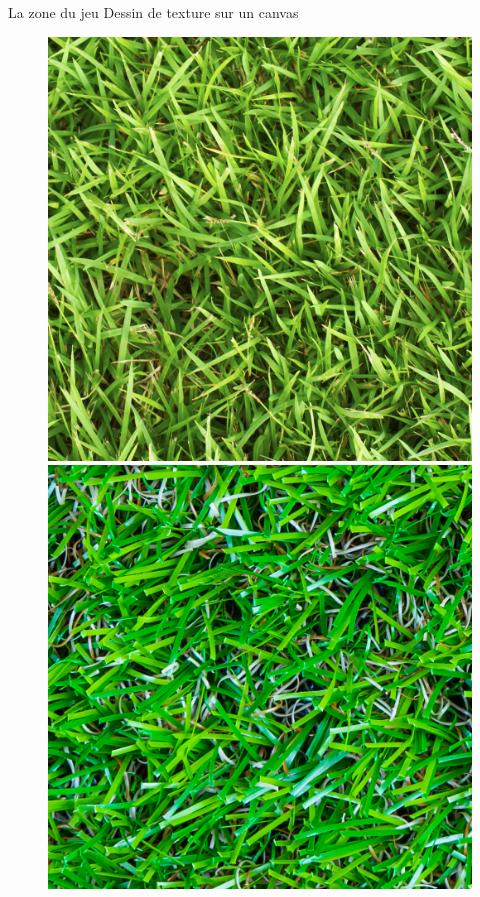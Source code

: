 \documentclass{beamer}
\begin{document}
%
%
\begin{frame}{La zone du jeu}
Dessin de texture sur un canvas
\begin{figure}
	\begin{minipage}[H]{0.33\linewidth}
        \centering
        \includegraphics[scale=0.20]{texture_grass_1.png}
    \end{minipage}\hfill
    \begin{minipage}[H]{0.33\linewidth}
    	\centering
        \includegraphics[scale=0.20]{texture_grass_2.png}

\end{minipage}
\end{figure}
\end{frame}
\end{document}
